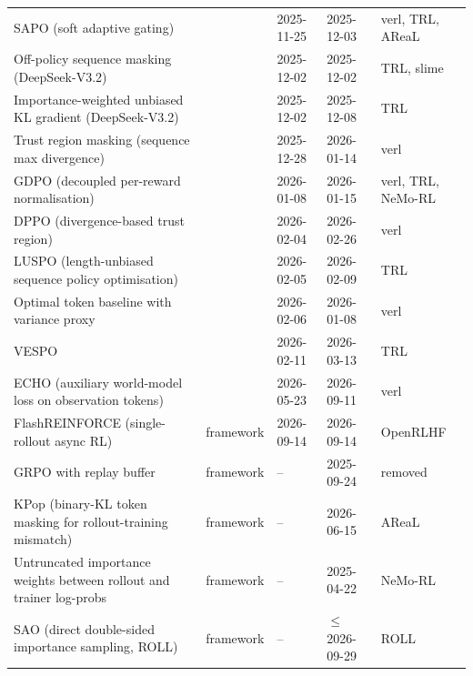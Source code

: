 \begin{longtable}{@{}>{\raggedright\arraybackslash}p{3.5cm} >{\raggedright\arraybackslash}p{2.3cm} l l >{\raggedright\arraybackslash}p{2.9cm}@{}}
SAPO (soft adaptive gating) & \citet{arxiv251120347} & 2025-11-25 & 2025-12-03 & verl, TRL, AReaL \\
Off-policy sequence masking (DeepSeek-V3.2) & \citet{arxiv251202556} & 2025-12-02 & 2025-12-02 & TRL, slime \\
Importance-weighted unbiased KL gradient (DeepSeek-V3.2) & \citet{arxiv251202556} & 2025-12-02 & 2025-12-08 & TRL \\
Trust region masking (sequence max divergence) & \citet{arxiv251223075} & 2025-12-28 & 2026-01-14 & verl \\
GDPO (decoupled per-reward normalisation) & \citet{arxiv260105242} & 2026-01-08 & 2026-01-15 & verl, TRL, NeMo-RL \\
DPPO (divergence-based trust region) & \citet{arxiv260204879} & 2026-02-04 & 2026-02-26 & verl \\
LUSPO (length-unbiased sequence policy optimisation) & \citet{arxiv260205261} & 2026-02-05 & 2026-02-09 & TRL \\
Optimal token baseline with variance proxy & \citet{arxiv260207078} & 2026-02-06 & 2026-01-08 & verl \\
VESPO & \citet{arxiv260210693} & 2026-02-11 & 2026-03-13 & TRL \\
ECHO (auxiliary world-model loss on observation tokens) & \citet{arxiv260524517} & 2026-05-23 & 2026-09-11 & verl \\
FlashREINFORCE (single-rollout async RL) & framework & 2026-09-14 & 2026-09-14 & OpenRLHF \\
GRPO with replay buffer & framework & -- & 2025-09-24 & removed \\
KPop (binary-KL token masking for rollout-training mismatch) & framework & -- & 2026-06-15 & AReaL \\
Untruncated importance weights between rollout and trainer log-probs & framework & -- & 2025-04-22 & NeMo-RL \\
SAO (direct double-sided importance sampling, ROLL) & framework & -- & $\le$2026-09-29 & ROLL \\
\end{longtable}
